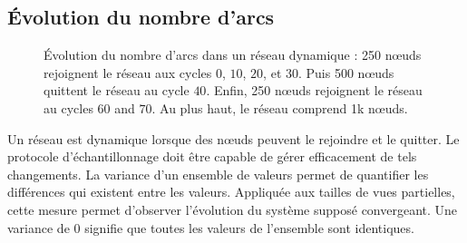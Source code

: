 \subsection{Évolution du nombre d'arcs}
\label{net:subsec:churn}

\begin{figure}
  \centering 
  \hspace{10pt}
  \caption[Évolution du nombre d'arcs dans un réseau dynamique]
  {\label{net:fig:churn} Évolution du nombre d'arcs dans un réseau dynamique :
    250 nœuds rejoignent le réseau aux cycles $0$, $10$, $20$, et $30$. Puis 500
    nœuds quittent le réseau au cycle $40$. Enfin, 250 nœuds rejoignent le
    réseau au cycles $60$ and $70$. Au plus haut, le réseau comprend 1k nœuds.}
\end{figure}

Un réseau est dynamique lorsque des nœuds peuvent le rejoindre et le quitter.
Le protocole d'échantillonnage doit être capable de gérer efficacement de tels
changements. La variance d'un ensemble de valeurs permet de quantifier les
différences qui existent entre les valeurs. Appliquée aux tailles de vues
partielles, cette mesure permet d'observer l'évolution du système supposé
convergeant. Une variance de 0 signifie que toutes les valeurs de l'ensemble
sont identiques.

